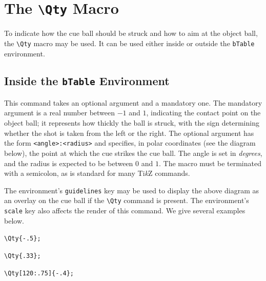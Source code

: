 \documentclass[11pt,a4paper]{ltxdoc}
\def\bluett#1{{\color{blue}\texttt{#1}}}
\begin{document}
\section{The \bluett{\textbackslash Qty} Macro}

To indicate how the cue ball should be struck and how to aim at the object ball, the \bluett{\textbackslash Qty} macro may be used. It can be used either inside or outside the \bluett{bTable} environment.

\subsection{Inside the \bluett{bTable} Environment}

This command takes an optional argument and a mandatory one. The mandatory argument is a real number between $-1$ and $1$, indicating the contact point on the object ball; it represents how thickly the ball is struck, with the sign determining whether the shot is taken from the left or the right. The optional argument has the form \texttt{<angle>:<radius>} and specifies, in polar coordinates (see the diagram below), the point at which the cue strikes the cue ball. The angle is set in \textit{degrees}, and the radius is expected to be between $0$ and $1$. The macro must be terminated with a semicolon, as is standard for many Ti\textit{k}Z commands.

\begin{center}
\end{center}

The environment's \bluett{guidelines} key may be used to display the above diagram as an overlay on the cue ball if the \bluett{\textbackslash Qty} command is present. The environment's \bluett{scale} key also affects the render of this command. We give several examples below.\medskip

\begin{minipage}{.33\linewidth}\centering
    \par
    {\color{blue}\verb|\Qty{-.5};|}
\end{minipage}
\begin{minipage}{.34\linewidth}\centering
    \par
    {\color{blue}\verb|\Qty{.33};|}
\end{minipage}
\begin{minipage}{.33\linewidth}\centering
    \par
    {\color{blue}\verb|\Qty[120:.75]{-.4};|}
\end{minipage}
\bigskip
\end{document}
